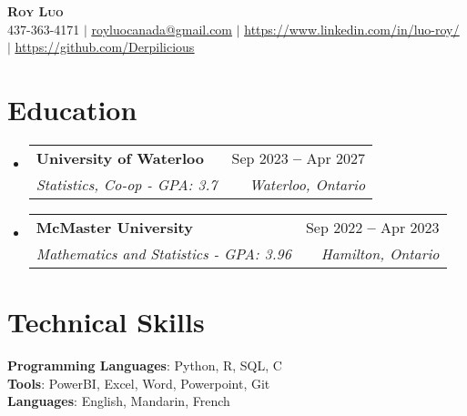 \documentclass[letterpaper,11pt]{article}
\makeatletter
\newcommand{\resumeSubheading}[4]{
  \vspace{-2pt}\item
    \begin{tabular*}{0.97\textwidth}[t]{l@{\extracolsep{\fill}}r}
      \textbf{#1} & #2 \\
      \textit{\small#3} & \textit{\small #4} \\
    \end{tabular*}\vspace{-7pt}
}
\newcommand{\resumeSubHeadingListStart}{\begin{itemize}[leftmargin=0.15in, label={}]}
\newcommand{\resumeSubHeadingListEnd}{\end{itemize}}
\makeatother
\begin{document}

\begin{center}
    \textbf{\Huge \scshape Roy Luo} \\ \vspace{1pt}
    \small 437-363-4171 $|$ \href{mailto:royluocanada@gmail.com}{\underline{royluocanada@gmail.com}} $|$ 
    \href{https://linkedin.com/in/luo-roy/}{\underline{https://www.linkedin.com/in/luo-roy/}} $|$
    \href{https://github.com/Derpilicious}{\underline{https://github.com/Derpilicious}}
\end{center}
 
\section{Education}
  \resumeSubHeadingListStart
    \resumeSubheading
      {University of Waterloo}{Sep 2023 \textbf{--} Apr 2027}
      {Statistics, Co-op - GPA: 3.7}{Waterloo, Ontario}
    \resumeSubheading
      {McMaster University}{Sep 2022 \textbf{--} Apr 2023}
      {Mathematics and Statistics - GPA: 3.96}{Hamilton, Ontario}
\resumeSubHeadingListEnd
      
\section{Technical Skills}
\begin{itemize}[leftmargin=0.15in, label={}]
   \small{\item{
    \textbf{Programming Languages}{: Python, R, SQL, C} \\
    \textbf{Tools}{: PowerBI, Excel, Word, Powerpoint, Git} \\
    \textbf{Languages}{: English, Mandarin, French} \\
   }}
 \end{itemize}
\end{document}
